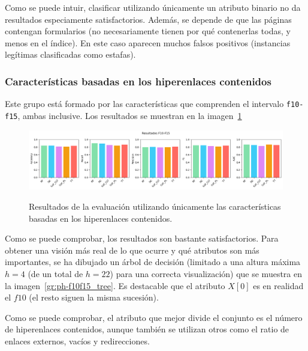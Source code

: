 Como se puede intuir, clasificar utilizando únicamente un atributo binario no da resultados especiamente satisfactorios. Además, se depende de que las páginas contengan formularios (no necesariamente tienen por qué contenerlas todas, y menos en el índice). En este caso aparecen muchos falsos positivos (instancias legítimas clasificadas como estafas).

\subsubsection{Características basadas en los hiperenlaces contenidos}
Este grupo está formado por las características que comprenden el intervalo \texttt{f10-f15}, ambas inclusive. Los resultados se muestran en la imagen~\ref{gr:ph-f10f15_small}

\begin{figure}[h]
	\caption[\textit{Phishing}: detección (\texttt{f10-f15})]{Resultados de la evaluación utilizando únicamente las características basadas en los hiperenlaces contenidos.}
	\centering
	\includegraphics[width=\textwidth]{../img/memoria/5_phishing/f10f15_small}
	\label{gr:ph-f10f15_small}
\end{figure}

Como se puede comprobar, los resultados son bastante satisfactorios. Para obtener una visión más real de lo que ocurre y qué atributos son más importantes, se ha dibujado un árbol de decisión (limitado a una altura máxima $h = 4$ (de un total de $h = 22$) para una correcta visualización) que se muestra en la imagen~\ref{gr:ph-f10f15_tree}. Es destacable que el atributo $X[0]$ es en realidad el $f10$ (el resto siguen la misma sucesión).

Como se puede comprobar, el atributo que mejor divide el conjunto es el número de hiperenlaces contenidos, aunque también se utilizan otros como el ratio de enlaces externos, vacíos y redirecciones.

